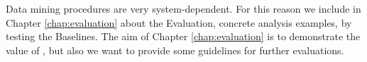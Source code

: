 %
%
Data mining procedures are very system-dependent. For this reason we include in Chapter \ref{chap:evaluation} about the \name Evaluation, concrete analysis examples, by testing the Baselines. The aim of Chapter \ref{chap:evaluation} is to demonstrate the value of \namens, but also we want to provide some guidelines for further evaluations.
